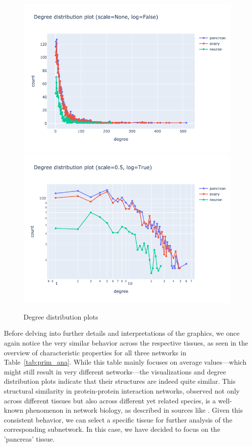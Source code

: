 \documentclass[paper=a4,fontsize=11pt,DIV=8,BCOR=5mm,oneside,pdftex,bibtotocnumbered]{scrreprt}
\theoremstyle{plain}
\begin{document}
	 \begin{figure}
		\centering
		\caption{Degree distribution plots}
		\includegraphics[scale=0.6]{degree_distribution_scale=None_log=False.png}
		\includegraphics[scale=0.6]{degree_distribution_scale=0.5_log=True.png}
		\label{fig:degree_dist_plot}
	\end{figure}
	
	Before delving into further details and interpretations of the graphics, we once again notice the very similar behavior across the respective tissues, as seen in the overview of characteristic properties for all three networks in Table~\ref{tab:prim_ana}. While this table mainly focuses on average values—which might still result in very different networks—the visualizations and degree distribution plots indicate that their structures are indeed quite similar. This structural similarity in protein-protein interaction networks, observed not only across different tissues but also across different yet related species, is a well-known phenomenon in network biology, as described in sources like \cite{SafariAlighiarloo2014}. Given this consistent behavior, we can select a specific tissue for further analysis of the corresponding subnetwork. In this case, we have decided to focus on the 'pancreas' tissue.
	
\end{document}
